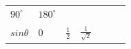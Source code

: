 {\begin{tabular}[t]{|l|l|l|l|l|l|l|}
                  \begin{math}{90}^{\circ }\end{math}
                 &
    
    
        
                  \begin{math}{180}^{\circ }\end{math}
     \tabularnewline\cline{1-1}\cline{2-2}\cline{3-3}\cline{4-4}\cline{5-5}\cline{6-6}\cline{7-7}
    
    
        
                  \begin{math}sin\theta \end{math}
                 &
    
    
        0 &
    
    
        
                  \begin{math}\frac{1}{2}\end{math}
                 &
    
    
        
                  \begin{math}\frac{1}{\sqrt{2}}\end{math}
                 &
    

\end{tabular}}
